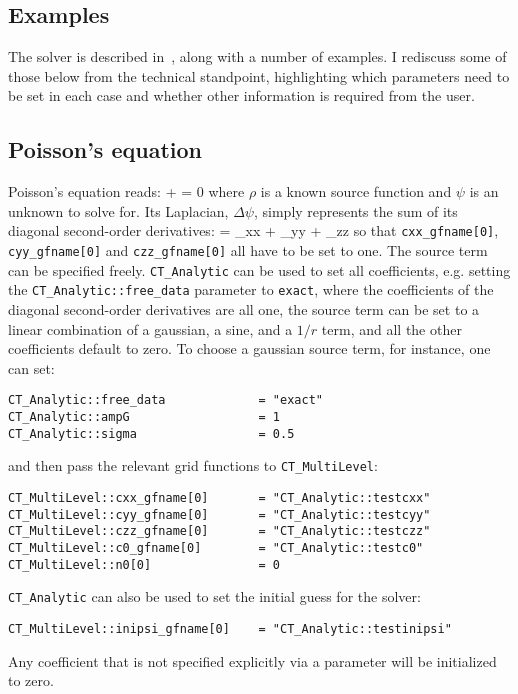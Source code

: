 \subsection{Examples}
The solver is described in~\cite{Bentivegna:2013xna}, along with a number
of examples. I rediscuss some of those below from the technical
standpoint, highlighting which parameters need to be set in each case
and whether other information is required from the user.

\subsection{Poisson's equation}
Poisson's equation reads:
\beq
\Delta \psi + \rho = 0
\eeq
where $\rho$ is a known source function and $\psi$ is an unknown
to solve for. Its Laplacian, $\Delta \psi$, simply represents the
sum of its diagonal second-order derivatives:
\beq
\Delta \psi = \partial_{xx} \psi + \partial_{yy} \psi + \partial_{zz} \psi
\eeq
so that \texttt{cxx\_gfname[0]}, \texttt{cyy\_gfname[0]} and \texttt{czz\_gfname[0]}
all have to be set to one. The source term can be specified freely.
\texttt{CT\_Analytic} can be used to set all coefficients, e.g. 
setting the \texttt{CT\_Analytic::free\_data} parameter to \texttt{exact}, 
where the coefficients of the diagonal second-order derivatives are
all one, the source term can be set to a linear combination of a
gaussian, a sine, and a $1/r$ term, and all the other coefficients
default to zero. To choose a gaussian source term, for instance, one
can set:
\begin{verbatim}
CT_Analytic::free_data             = "exact"
CT_Analytic::ampG                  = 1
CT_Analytic::sigma                 = 0.5
\end{verbatim}
and then pass the relevant grid functions to \texttt{CT\_MultiLevel}:
\begin{verbatim}
CT_MultiLevel::cxx_gfname[0]       = "CT_Analytic::testcxx"
CT_MultiLevel::cyy_gfname[0]       = "CT_Analytic::testcyy"
CT_MultiLevel::czz_gfname[0]       = "CT_Analytic::testczz"
CT_MultiLevel::c0_gfname[0]        = "CT_Analytic::testc0"
CT_MultiLevel::n0[0]               = 0
\end{verbatim}
\texttt{CT\_Analytic} can also be used to set the initial guess for
the solver:
\begin{verbatim}
CT_MultiLevel::inipsi_gfname[0]    = "CT_Analytic::testinipsi"
\end{verbatim}
Any coefficient that is not specified explicitly via a parameter 
will be initialized to zero.

